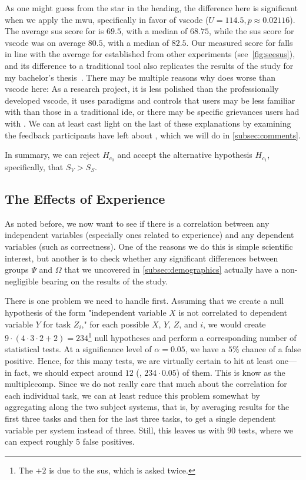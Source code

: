 \documentclass[../thesis]{subfiles}
\begin{document}
As one might guess from the star in the heading, the difference here is significant when we apply the \gls{mwu}, specifically in favor of \gls{vscode} ($U = 114.5, p \approx 0.02116$).
The average \gls{sus} score for \SEE{} is $69.5$, with a median of $68.75$, while the \gls{sus} score for \gls{vscode} was on average $80.5$, with a median of $82.5$.
Our measured score for \SEE{} falls in line with the average for \SEE{} established from other experiments (see~\cref{fig:seesus}), and its difference to a traditional tool also replicates the results of the study for my bachelor's thesis~\cite{galperin2022}.
There may be multiple reasons why \SEE{} does worse than \gls{vscode} here:
As a research project, it is less polished than the professionally developed \gls{vscode}, it uses paradigms and controls that users may be less familiar with than those in a traditional \gls{ide}, or there may be specific grievances users had with \SEE{}.
We can at least cast light on the last of these explanations by examining the feedback participants have left about \SEE{}, which we will do in \cref{subsec:comments}.

In summary, we can reject $H_{c_0}$ and accept the alternative hypothesis $H_{c_1}$, specifically, that $S_V > S_S$.

\subsection{The Effects of Experience}\label{subsec:experience}
As noted before, we now want to see if there is a correlation between any independent variables (especially ones related to experience) and any dependent variables (such as correctness).
One of the reasons we do this is simple scientific interest, but another is to check whether any significant differences between groups $\Psi$ and $\Omega$ that we uncovered in \cref{subsec:demographics} actually have a non-negligible bearing on the results of the study.

There is one problem we need to handle first.
Assuming that we create a null hypothesis of the form "independent variable $X$ is not correlated to dependent variable $Y$ for task $Z_i$," for each possible $X$, $Y$, $Z$, and $i$, we would create $9 \cdot (4 \cdot 3 \cdot 2 + 2) = 234$\footnote{The $+2$ is due to the \gls{sus}, which is asked twice.} null hypotheses and perform a corresponding number of statistical tests.
At a significance level of $\alpha = 0.05$, we have a $5\%$ chance of a false positive.
Hence, for this many tests, we are virtually certain to hit at least one---in fact, we should expect around $12$ (\ie, $234 \cdot 0.05$) of them.
This is know as the \gls{multiplecomp}.
Since we do not really care that much about the correlation for each individual task, we can at least reduce this problem somewhat by aggregating along the two subject systems, that is, by averaging results for the first three tasks and then for the last three tasks, to get a single dependent variable per system instead of three.
Still, this leaves us with $90$ tests, where we can expect roughly 5 false positives.
\end{document}
